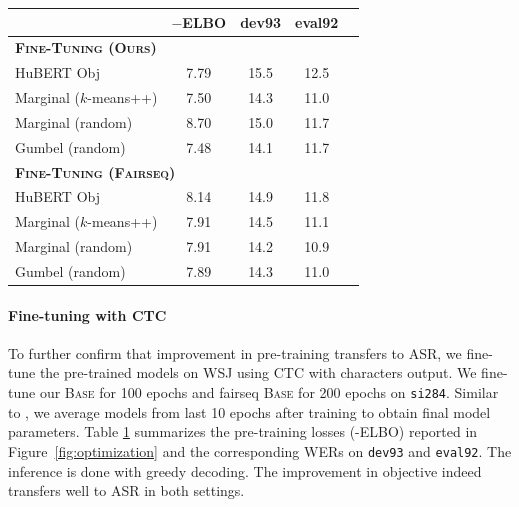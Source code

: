 \documentclass[11pt,a4paper]{article}
\begin{document}
\begin{table}[t]
\centering
{}
\label{tab:ctc}
\begin{threeparttable}
\footnotesize
\begin{tabularx}{0.94\linewidth}{lcccc}
  \toprule
     &$-$ELBO &dev93 &eval92\\[1pt]
  \midrule
  \multicolumn{3}{l}{\textbf{\textsc{Fine-Tuning (Ours)}}} &\\[1pt]
  HuBERT Obj               &7.79 &15.5 &12.5  \\
  Marginal ($k$-means++)     &7.50 &14.3 &11.0  \\
  Marginal (random)        &8.70 &15.0 &11.7  \\
  Gumbel (random)          &7.48 &14.1 &11.7  \\
  \midrule
  \multicolumn{3}{l}{\textbf{\textsc{Fine-Tuning (Fairseq)}}} &\\[1pt]
  HuBERT Obj               &8.14 &14.9 &11.8  \\
  Marginal ($k$-means++)     &7.91 &14.5 &11.1  \\
  Marginal (random)        &7.91 &14.2 &10.9  \\
  Gumbel (random)          &7.89 &14.3 &11.0  \\
  \bottomrule
\end{tabularx}
\end{threeparttable}
\end{table}


\paragraph{Fine-tuning with CTC}

%
%
To further confirm that improvement in pre-training transfers to ASR,
we fine-tune the pre-trained models on WSJ \citep{paul1992design} using CTC \citep{graves2006connectionist} with characters output. 
%
%
We fine-tune our \textsc{Base} for 100 epochs and fairseq \textsc{Base} for 200 epochs on \texttt{si284}.
%
%
%
Similar to \citet{lee2021intermediate,higuchi2020mask},
we average models from last 10 epochs after training to obtain final model parameters.
%
Table \ref{tab:ctc} summarizes the pre-training losses (-ELBO) reported in Figure~\ref{fig:optimization} and 
the corresponding WERs on \texttt{dev93} and \texttt{eval92}. The inference is done with greedy decoding.
%
%
%
The improvement in objective indeed transfers well to ASR in both settings.
\end{document}
